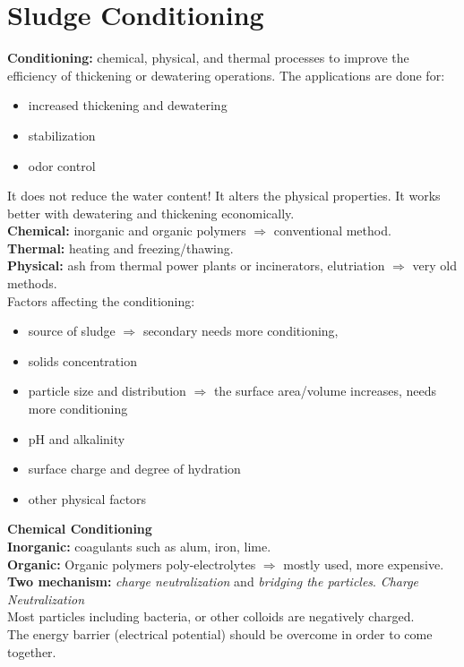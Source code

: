\documentclass{article}
\numberwithin{equation}{section}
\begin{document}
\section{Sludge Conditioning}
\textbf{Conditioning:} chemical, physical, and thermal processes to improve the efficiency of thickening or dewatering operations. The applications are done for:
\begin{itemize}
    \item increased thickening and dewatering
    \item stabilization
    \item odor control
\end{itemize}
It does not reduce the water content! It alters the physical properties. It works better with dewatering and thickening economically.\\
\textbf{Chemical:} inorganic and organic polymers $\Rightarrow$ conventional method.\\
\textbf{Thermal:} heating and freezing/thawing.\\
\textbf{Physical:} ash from thermal power plants or incinerators, elutriation $\Rightarrow$ very old methods.\\
Factors affecting the conditioning:
\begin{itemize}
    \item source of sludge $\Rightarrow$ secondary needs more conditioning,
    \item solids concentration
    \item particle size and distribution $\Rightarrow$ the surface area/volume increases, needs more conditioning
    \item pH and alkalinity
    \item surface charge and degree of hydration
    \item other physical factors
\end{itemize}
\textbf{Chemical Conditioning}\\
\textbf{Inorganic:} coagulants such as alum, iron, lime.\\
\textbf{Organic:} Organic polymers poly-electrolytes $\Rightarrow$ mostly used, more expensive.\\
\textbf{Two mechanism:} \emph{charge neutralization} and \emph{bridging the particles}.
\textit{Charge Neutralization}\\
Most particles including bacteria, or other colloids are negatively charged.\\
The energy barrier (electrical potential) should be overcome in order to come together.
\end{document}
